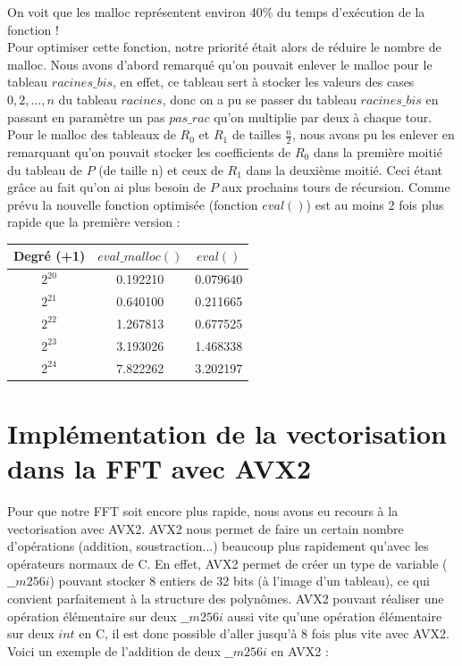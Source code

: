 \documentclass[12pt, a4paper]{article}
\begin{document}
On voit que les malloc représentent environ 40\% du temps d'exécution de la fonction ! \\
Pour optimiser cette fonction, notre priorité était alors de réduire le nombre de malloc. Nous avons d'abord remarqué qu'on pouvait enlever le malloc pour le tableau $racines\_bis$, en effet, ce tableau sert à stocker les valeurs des cases $0,2,\dots,n$ du tableau $racines$, donc on a pu se passer du tableau $racines\_bis$ en passant en paramètre un pas $pas\_rac$ qu'on multiplie par deux à chaque tour. \\
Pour le malloc des tableaux de $R_0$ et $R_1$ de tailles $\frac{n}{2}$, nous avons pu les enlever en remarquant qu'on pouvait stocker les coefficients de $R_0$ dans la première moitié du tableau de $P$ (de taille n) et ceux de $R_1$ dans la deuxième moitié. Ceci étant grâce au fait qu'on ai plus besoin de $P$ aux prochains tours de récursion.
Comme prévu la nouvelle fonction optimisée (fonction $eval()$) est au moins 2 fois plus rapide que la première version :

\begin{center}
\begin{tabular}{||c c c||}
\hline
Degré (+1) & $eval\_malloc()$ & $eval()$ \\
\hline\hline
$2^{20}$ & 0.192210 & 0.079640 \\
\hline
$2^{21}$ & 0.640100 & 0.211665 \\
\hline
$2^{22}$ & 1.267813 & 0.677525 \\
\hline
$2^{23}$ & 3.193026 & 1.468338 \\
\hline
$2^{24}$ & 7.822262 & 3.202197 \\
\hline
\end{tabular}
\end{center}

\section{Implémentation de la vectorisation dans la FFT avec AVX2}

Pour que notre FFT soit encore plus rapide, nous avons eu recours à la vectorisation avec AVX2. AVX2 nous permet de faire un certain nombre d'opérations (addition, soustraction...) beaucoup plus rapidement qu'avec les opérateurs normaux de C. En effet, AVX2 permet de créer un type de variable ($\_\_m256i$) pouvant stocker 8 entiers de 32 bits (à l'image d'un tableau), ce qui convient parfaitement à la structure des polynômes. AVX2 pouvant réaliser une opération élémentaire sur deux $\_\_m256i$ aussi vite qu'une opération élémentaire sur deux $int$ en C, il est donc possible d'aller jusqu'à 8 fois plus vite avec AVX2. Voici un exemple de l'addition de deux $\_\_m256i$ en AVX2 : 
\end{document}
